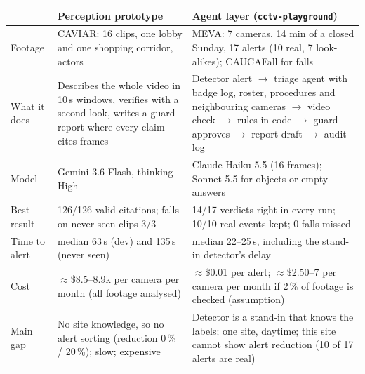 \documentclass[11pt,a4paper]{article}
\begin{document}
\begin{center}
\small
\begin{tabularx}{\textwidth}{L{2.6cm}YY}
\toprule
& \textbf{Perception prototype} & \textbf{Agent layer (\texttt{cctv-playground})}\\
\midrule
Footage & CAVIAR: 16 clips, one lobby and one shopping corridor, actors & MEVA: 7 cameras, 14 min of a closed Sunday, 17 alerts (10 real, 7 look-alikes); CAUCAFall for falls\\
What it does & Describes the whole video in 10\,s windows, verifies with a second look, writes a guard report where every claim cites frames & Detector alert $\rightarrow$ triage agent with badge log, roster, procedures and neighbouring cameras $\rightarrow$ video check $\rightarrow$ rules in code $\rightarrow$ guard approves $\rightarrow$ report draft $\rightarrow$ audit log\\
Model & Gemini 3.6 Flash, thinking High & Claude Haiku 5.5 (16 frames); Sonnet 5.5 for objects or empty answers\\
Best result & 126/126 valid citations; falls on never-seen clips 3/3 & 14/17 verdicts right in every run; 10/10 real events kept; 0 falls missed\\
Time to alert & median 63\,s (dev) and 135\,s (never seen) & median 22--25\,s, including the stand-in detector's delay\\
Cost & $\approx$\$8.5--8.9k per camera per month (all footage analysed) & $\approx$\$0.01 per alert; $\approx$\$2.50--7 per camera per month if 2\,\% of footage is checked (assumption)\\
Main gap & No site knowledge, so no alert sorting (reduction 0\,\% / 20\,\%); slow; expensive & Detector is a stand-in that knows the labels; one site, daytime; this site cannot show alert reduction (10 of 17 alerts are real)\\
\bottomrule
\end{tabularx}
\end{center}
\end{document}
